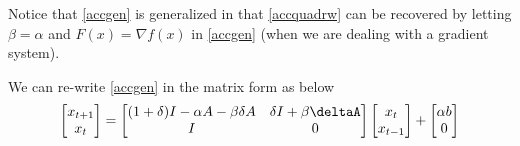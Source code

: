 Notice that \eqref{accgen} is generalized in that \eqref{accquadrw} can be recovered by letting $\beta=\alpha$ and $F(x)=\nabla f(x)$ in \eqref{accgen} (when we are dealing with a gradient system).
\par
We can re-write \eqref{accgen} in the matrix form as below
\begin{align}\label{accgenmat}
\begin{bmatrix} x_{t+1} \\ x_t\\\end{bmatrix}= \begin{bmatrix} (1+\delta)I-\alpha A-\beta\delta A & \delta I+\beta \deltaA \\ I &0\\\end{bmatrix} \begin{bmatrix} x_{t} \\ x_{t-1}\\\end{bmatrix}+ \begin{bmatrix} \alpha b \\ 0\\\end{bmatrix}
\end{align}

